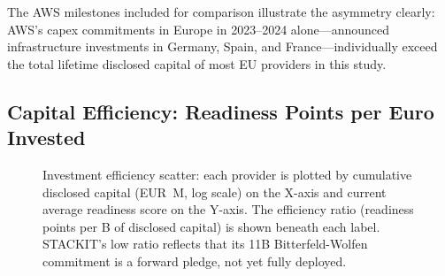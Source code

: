 The AWS milestones included for comparison illustrate the asymmetry clearly: AWS's capex commitments in Europe in 2023--2024 alone---announced infrastructure investments in Germany, Spain, and France---individually exceed the total lifetime disclosed capital of most EU providers in this study.

\subsection{Capital Efficiency: Readiness Points per Euro Invested}
\label{subsec:capital_efficiency}

\begin{figure}[htbp]
  \centering
  \caption{Investment efficiency scatter: each provider is plotted by cumulative disclosed capital (EUR~M, log scale) on the X-axis and current average readiness score on the Y-axis. The efficiency ratio (readiness points per \texteuro{}B of disclosed capital) is shown beneath each label. STACKIT's low ratio reflects that its \texteuro{}11B Bitterfeld-Wolfen commitment is a forward pledge, not yet fully deployed.}
  \label{fig:capital_efficiency}
\end{figure}

